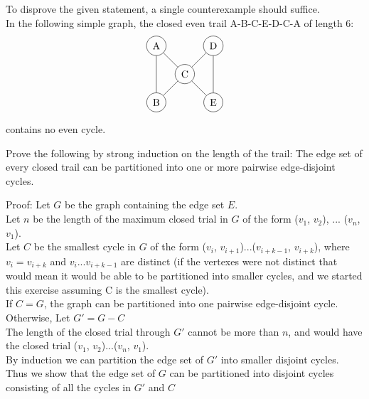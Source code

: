 \documentclass[12pt]{article}
\newenvironment{question}[2][Question]{\begin{trivlist}
\item[\hskip \labelsep {\bfseries #1}\hskip \labelsep {\bfseries #2.}]}{\end{trivlist}}
\begin{document}
To disprove the given statement, a single counterexample should suffice.\\
In the following simple graph, the closed even trail A-B-C-E-D-C-A of length 6:\\
\begin{align*}
\begin{tikzpicture}
\node[shape=circle,draw=black] (B) at (1,0) {A};
\node[shape=circle,draw=black] (D) at (1,-2) {B};
\node[shape=circle,draw=black] (E) at (2,-1) {C};
\node[shape=circle,draw=black] (F) at (3,0) {D};
\node[shape=circle,draw=black] (H) at (3,-2) {E};
\path [] (B) edge node[left] {} (E);
\path [] (D) edge node[left] {} (E);
\path [] (E) edge node[left] {} (F);
\path [] (H) edge node[left] {} (E);
\path [] (B) edge node[left] {} (D);
\path [] (F) edge node[left] {} (H);
\end{tikzpicture}
\end{align*}
contains no even cycle. \\

\begin{question}{3}
Prove the following by strong induction on the length of the trail: The edge set of every closed trail can be partitioned into one or more pairwise edge-disjoint cycles.
\end{question}

Proof: Let $G$ be the graph containing the edge set $E$. \\

Let $n$ be the length of the maximum closed trial in $G$ of the form ($v_1$, $v_2$), ... ($v_n$, $v_1$). \\

Let $C$ be the smallest cycle in $G$ of the form ($v_i$, $v_{i+1}$)...($v_{i+k-1}$, $v_{i+k}$), where $v_i = v_{i+k}$ and $v_i$...$v_{i+k-1}$ are distinct (if the vertexes were not distinct that would mean it would be able to be partitioned into smaller cycles, and we started this exercise assuming C is the smallest cycle). \\

If $C = G$, the graph can be partitioned into one pairwise edge-disjoint cycle.\\

Otherwise, Let $G' = G - C$\\

The length of the closed trial through $G'$ cannot be more than $n$, and would have the closed trial ($v_1$, $v_2$)...($v_n$, $v_1$). \\

By induction we can partition the edge set of $G'$ into smaller disjoint cycles. Thus we show that the edge set of $G$ can be partitioned into disjoint cycles consisting of all the cycles in $G'$ and $C$\\
\end{document}
